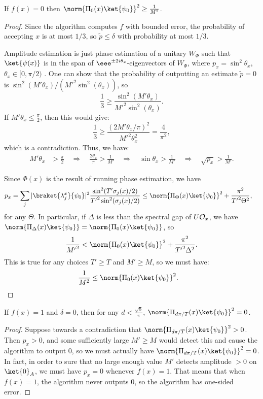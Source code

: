 \documentclass{toc}
\begin{document}
\begin{claim}
If $f(x)=0$ then $\norm{\Pi_0(x)\ket{\psi_0}}^2\geq \frac{1}{M^2}$.
\end{claim}
\begin{proof}
Since the algorithm computes $f$ with bounded error, the probability of accepting $x$ is at most $1/3$, so $\tilde p\leq\delta$ with probability at most $1/3$. 

Amplitude estimation is just phase estimation of a unitary $W_{\Phi}$ such that $\ket{\psi(x)}$ is in the span of $\eee^{\pm 2i\theta_x}$-eigenvectors of $W_{\Phi}$, where $p_x=\sin^2\theta_x$, $\theta_x\in [0,\pi/2)$ \cite{BHMT02}. One can show that the probability of outputting an estimate $\tilde p=0$ is $\sin^2(M'\theta_x)/({M'}^2\sin^2(\theta_x))$, so 
$$\frac{1}{3}\geq \frac{\sin^2(M'\theta_x)}{{M'}^2\sin^2(\theta_x)}.$$
If $M'\theta_x\leq \frac{\pi}{2}$, then this would give:
$$\frac{1}{3}\geq \frac{(2M'\theta_x/\pi)^2}{{M'}^2\theta_x^2}=\frac{4}{\pi^2},$$
which is a contradiction. Thus, we have:
\begin{align*}
M'\theta_x &> \frac{\pi}{2} 
\quad\Rightarrow\quad \frac{2\theta_x}{\pi} > \frac{1}{M'}
\quad\Rightarrow\quad \sin\theta_x > \frac{1}{M'}
\quad\Rightarrow\quad \sqrt{p_x} > \frac{1}{M'}.
\end{align*}

Since $\Phi(x)$ is the result of running phase estimation, we have 
\begin{align*}
p_x &= \sum_j |\braket{\lambda_j^x}{\psi_0}|^2\frac{\sin^2(T'\sigma_j(x)/2)}{{T'}^2\sin^2(\sigma_j(x)/2)}
\leq \norm{\Pi_\Theta(x)\ket{\psi_0}}^2+\frac{\pi^2}{{T'}^2\Theta^2},
\end{align*}
for any $\Theta$. In particular, if $\Delta$ is less than the spectral gap of $U{\cal O}_x$, we have $\norm{\Pi_\Delta(x)\ket{\psi_0}}=\norm{\Pi_0(x)\ket{\psi_0}}$, so 
$$\frac{1}{{M'}^2}< \norm{\Pi_0(x)\ket{\psi_0}}^2 + \frac{\pi^2}{{T'}^2\Delta^2}.$$
This is true for any choices $T'\geq T$ and $M'\geq M$, so we must have:
\begin{align*}
\frac{1}{M^2} &\leq \norm{\Pi_0(x)\ket{\psi_0}}^2.\qedhere
\end{align*}
\end{proof}

\begin{claim}
If $f(x)=1$ and $\delta=0$, then for any $d<\frac{\sqrt{8}}{\pi}$, $\norm{\Pi_{d\pi/T}(x)\ket{\psi_0}}^2=0$.
\end{claim}
\begin{proof}
Suppose towards a contradiction that $\norm{\Pi_{d\pi/T}(x)\ket{\psi_0}}^2>0$. Then $p_x>0$, and some sufficiently large $M'\geq M$ would detect this and cause the algorithm to output 0, so we must actually have $\norm{\Pi_{d\pi/T}(x)\ket{\psi_0}}^2=0$. In fact, in order to sure that no large enough value $M'$ detects amplitude $>0$ on $\ket{0}_A$, we must have $p_x=0$ whenever $f(x)=1$. That means that when $f(x)=1$, the algorithm never outputs 0, so the algorithm has one-sided error.
\end{proof}
\end{document}

